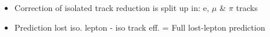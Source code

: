 \documentclass{beamer}
\begin{document}
\begin{frame}
\begin{columns}
\begin{column}{0.50\textwidth}
   
 \end{column}
 \begin{column}{0.50\textwidth}
\begin{center}
 \end{center}
 \end{column}
 \end{columns}
 \begin{itemize}
  \item Correction of isolated track reduction is split up in: e, $\mu$ \& $\pi$ tracks
  \item Prediction lost iso. lepton - iso track eff. = Full lost-lepton prediction
 \end{itemize}

\end{frame}
\end{document}

